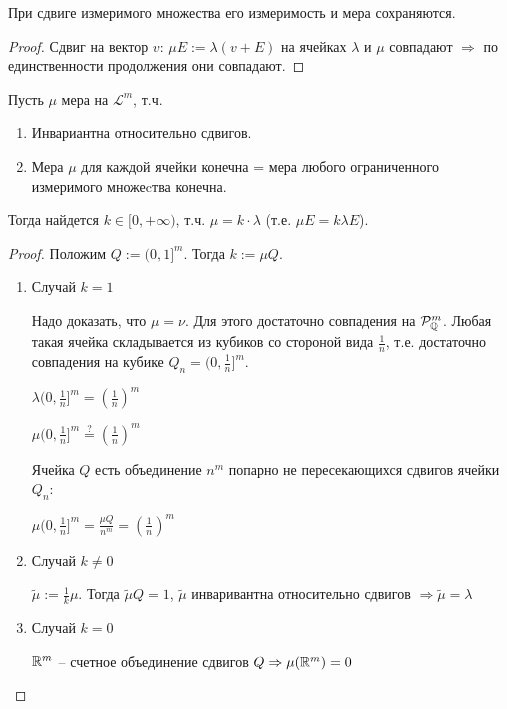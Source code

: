 \begin{theorem}
    При сдвиге измеримого множества его измеримость и мера сохраняются. 
\end{theorem}

\begin{proof}
    Сдвиг на вектор $v$: $\mu E:=\lambda (v + E)$ на ячейках 
    $\lambda$ и $\mu$ совпадают $\Rightarrow$ по единственности продолжения они совпадают.
\end{proof}

\begin{theorem}
    Пусть $\mu$ мера на $\mathcal{L}^m$, т.ч.

    \begin{enumerate}
        \item Инвариантна относительно сдвигов.
        \item Мера $\mu$ для каждой ячейки конечна = мера любого ограниченного измеримого множеcтва конечна.
    \end{enumerate}

    Тогда найдется $k\in [0, +\infty)$, т.ч. $\mu = k\cdot \lambda$ (т.е. $\mu E = k\lambda E$).
\end{theorem}

\begin{proof}
    Положим $Q:= (0, 1]^m$. Тогда $k := \mu Q$.

    \begin{enumerate}
        \item Случай $k=1$
        
        Надо доказать, что $\mu =\nu$. Для этого достаточно совпадения на $\mathcal{P}^m_{\mathbb{Q}}$.
        Любая такая ячейка складывается из кубиков со стороной вида $\frac{1}{n}$, т.е. достаточно 
        совпадения на кубике $Q_n =(0, \frac{1}{n}]^m$.

        $\lambda (0, \frac{1}{n}]^m= (\frac{1}{n})^m$

        $\mu (0, \frac{1}{n}]^m\overset{?}{=} (\frac{1}{n})^m$

        Ячейка $Q$ есть объединение $n^m$ попарно не пересекающихся сдвигов ячейки $Q_n$:

        $\mu (0, \frac{1}{n}]^m= \frac{\mu Q}{n^m}=(\frac{1}{n})^m$

        \item Случай $k\not = 0$
        
        $\tilde{\mu}:=\frac{1}{k}\mu$. Тогда $\tilde{\mu} Q=1$, $\tilde{\mu}$ инваривантна
        относительно сдвигов $\Rightarrow\tilde{\mu}=\lambda$

        \item Случай $k = 0$
        
        $\mathbb{R}^m$ – счетное объединение сдвигов $Q\Rightarrow\mu (\mathbb{R}^m)=0$
    \end{enumerate}
\end{proof}

